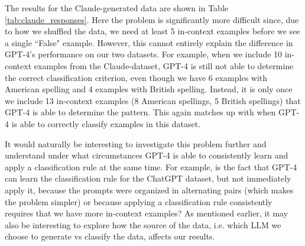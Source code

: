 \documentclass{article}
\begin{document}
The results for the Claude-generated data are shown in Table \ref{tab:claude_responses}.
Here the problem is significantly more difficult since, due to how we shuffled the data, we need at least 5 in-context examples before we see a single ``False" example. 
However, this cannot entirely explain the difference in GPT-4's performance on our two datasets.
For example, when we include 10 in-context examples from the Claude-dataset, GPT-4 is still not able to determine the correct classification criterion, even though we have 6 examples with American spelling and 4 examples with British spelling.
Instead, it is only once we include 13 in-context examples (8 American spellings, 5 British spellings) that GPT-4 is able to determine the pattern.
This again matches up with when GPT-4 is able to correctly classify examples in this dataset.

It would naturally be interesting to investigate this problem further and understand under what circumstances GPT-4 is able to consistently learn and apply a classification rule at the same time.
For example, is the fact that GPT-4 can learn the classification rule for the ChatGPT dataset, but not immediately apply it, because the prompts were organized in alternating pairs (which makes the problem simpler) or because applying a classification rule consistently requires that we have more in-context examples?
As mentioned earlier, it may also be interesting to explore how the source of the data, i.e. which LLM we choose to generate vs classify the data, affects our results.

\end{document}
